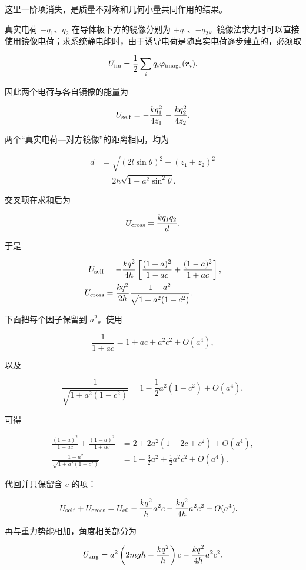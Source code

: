 \documentclass[12pt,a4paper,UTF8]{ctexart}
\begin{document}
这里一阶项消失，是质量不对称和几何小量共同作用的结果。

真实电荷 \(-q_1\)、\(q_2\) 在导体板下方的镜像分别为
\(+q_1\)、\(-q_2\)。镜像法求力时可以直接使用镜像电荷；求系统静电能时，由于诱导电荷是随真实电荷逐步建立的，必须取

\[
U_{\rm im}=\frac12\sum_i q_i\varphi_{\rm image}(\boldsymbol r_i).
\]

因此两个电荷与各自镜像的能量为

\[
U_{\rm self}
=-\frac{kq_1^2}{4z_1}-\frac{kq_2^2}{4z_2}.
\]

两个``真实电荷---对方镜像''的距离相同，均为

\[
\begin{aligned}
d
&=\sqrt{(2l\sin\theta)^2+(z_1+z_2)^2}\\
&=2h\sqrt{1+a^2\sin^2\theta}.
\end{aligned}
\]

交叉项在求和后为

\[
U_{\rm cross}=\frac{kq_1q_2}{d}.
\]

于是

\[
\begin{aligned}
U_{\rm self}
&=-\frac{kq^2}{4h}
\left[
\frac{(1+a)^2}{1-ac}
+\frac{(1-a)^2}{1+ac}
\right],\\
U_{\rm cross}
&=\frac{kq^2}{2h}
\frac{1-a^2}{\sqrt{1+a^2(1-c^2)}}.
\end{aligned}
\]

下面把每个因子保留到 \(a^2\)。使用

\[
\frac1{1\mp ac}=1\pm ac+a^2c^2+O(a^4),
\]

以及

\[
\frac1{\sqrt{1+a^2(1-c^2)}}
=1-\frac12a^2(1-c^2)+O(a^4),
\]

可得

\[
\begin{aligned}
\frac{(1+a)^2}{1-ac}
+\frac{(1-a)^2}{1+ac}
&=2+2a^2(1+2c+c^2)+O(a^4),\\
\frac{1-a^2}{\sqrt{1+a^2(1-c^2)}}
&=1-\frac32a^2+\frac12a^2c^2+O(a^4).
\end{aligned}
\]

代回并只保留含 \(c\) 的项：

\[
\begin{aligned}
U_{\rm self}+U_{\rm cross}
&=U_{\rm e0}
-\frac{kq^2}{h}a^2c
-\frac{kq^2}{4h}a^2c^2
+O(a^4).
\end{aligned}
\]

再与重力势能相加，角度相关部分为

\[
U_{\rm ang}
=a^2\left(2mgh-\frac{kq^2}{h}\right)c
-\frac{kq^2}{4h}a^2c^2.
\]
\end{document}
